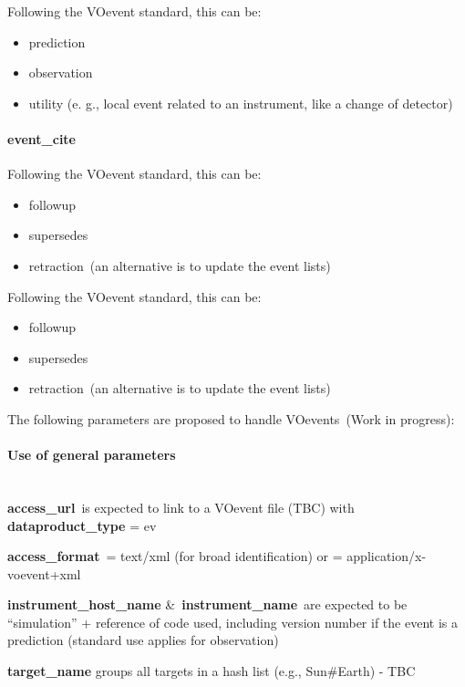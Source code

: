 \documentclass[11pt,a4paper]{ivoa}
\begin{document}
Following the VOevent standard, this can be:

\begin{itemize}
\item prediction
\item observation
\item utility (e. g., local event related to an instrument, like a change of detector)
\end{itemize}

\paragraph{event\_cite}

Following the VOevent standard, this can be:

\begin{itemize}
\item followup
\item supersedes
\item retraction (an alternative is to update the event lists)
\end{itemize}

Following the VOevent standard, this can be:

\begin{itemize}
\item followup
\item supersedes
\item retraction (an alternative is to update the event lists)
\end{itemize}

The following parameters are proposed to handle VOevents (Work in progress):

\paragraph{Use of general parameters\textbf{ }}

\\

\textbf{access\_url} is expected to link to a VOevent file (TBC) with \textbf{dataproduct\_type} = ev 

\textbf{access\_format} = text/xml (for broad identification) or = application/x-voevent+xml 

\textbf{instrument\_host\_name }\& \textbf{instrument\_name} are expected to be ``simulation'' + reference of code used, including version number if the event is a prediction (standard use applies for observation)

\textbf{target\_name} groups all targets in a hash list (e.g., Sun\#Earth) - TBC
\end{document}
